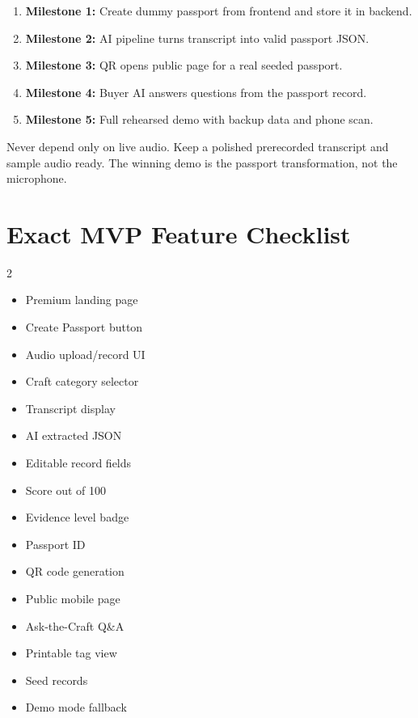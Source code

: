 \documentclass[11pt,a4paper]{article}
\begin{document}
\begin{enumerate}
  \item \textbf{Milestone 1:} Create dummy passport from frontend and store it in backend.
  \item \textbf{Milestone 2:} AI pipeline turns transcript into valid passport JSON.
  \item \textbf{Milestone 3:} QR opens public page for a real seeded passport.
  \item \textbf{Milestone 4:} Buyer AI answers questions from the passport record.
  \item \textbf{Milestone 5:} Full rehearsed demo with backup data and phone scan.
\end{enumerate}

\begin{redbox}
Never depend only on live audio. Keep a polished prerecorded transcript and sample audio ready. The winning demo is the passport transformation, not the microphone.
\end{redbox}

\section{Exact MVP Feature Checklist}

\begin{multicols}{2}
\begin{itemize}
  \item Premium landing page
  \item Create Passport button
  \item Audio upload/record UI
  \item Craft category selector
  \item Transcript display
  \item AI extracted JSON
  \item Editable record fields
  \item Score out of 100
  \item Evidence level badge
  \item Passport ID
  \item QR code generation
  \item Public mobile page
  \item Ask-the-Craft Q\&A
  \item Printable tag view
  \item Seed records
  \item Demo mode fallback
\end{itemize}
\end{multicols}
\end{document}
